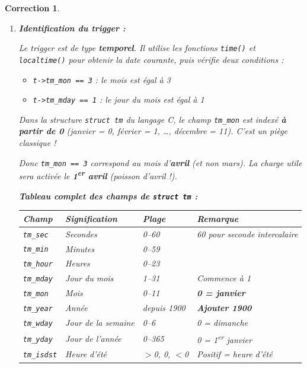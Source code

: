 \documentclass[a4paper,11pt]{article}
\theoremstyle{plain}
\newtheorem{correction}{Correction}
\theoremstyle{definition}
\begin{document}
\begin{correction}

\begin{enumerate}
\item \textbf{Identification du trigger :}

Le trigger est de type \textbf{temporel}. Il utilise les fonctions \texttt{time()} et \texttt{localtime()} pour obtenir la date courante, puis vérifie deux conditions :
\begin{itemize}
\item \texttt{t->tm\_mon == 3} : le mois est égal à 3
\item \texttt{t->tm\_mday == 1} : le jour du mois est égal à 1
\end{itemize}

\begin{attention}
Dans la structure \texttt{struct tm} du langage C, le champ \texttt{tm\_mon} est indexé \textbf{à partir de 0} (janvier = 0, février = 1, \ldots, décembre = 11). C'est un piège classique !

Donc \texttt{tm\_mon == 3} correspond au mois d'\textbf{avril} (et non mars). La charge utile sera activée le \textbf{1\textsuperscript{er} avril} (poisson d'avril !).
\end{attention}

\textbf{Tableau complet des champs de \texttt{struct tm} :}

\medskip
\begin{center}
\begin{tabular}{llll}
\toprule
\textbf{Champ} & \textbf{Signification} & \textbf{Plage} & \textbf{Remarque} \\
\midrule
\texttt{tm\_sec}   & Secondes         & 0--60  & 60 pour seconde intercalaire \\
\texttt{tm\_min}   & Minutes          & 0--59  & \\
\texttt{tm\_hour}  & Heures           & 0--23  & \\
\texttt{tm\_mday}  & Jour du mois     & 1--31  & Commence à 1 \\
\texttt{tm\_mon}   & Mois             & 0--11  & \textbf{0 = janvier} \\
\texttt{tm\_year}  & Année            & depuis 1900 & \textbf{Ajouter 1900} \\
\texttt{tm\_wday}  & Jour de la semaine & 0--6 & 0 = dimanche \\
\texttt{tm\_yday}  & Jour de l'année  & 0--365 & 0 = 1\textsuperscript{er} janvier \\
\texttt{tm\_isdst} & Heure d'été      & $>$0, 0, $<$0 & Positif = heure d'été \\
\bottomrule
\end{tabular}
\end{center}


\end{enumerate}
\end{correction}
\end{document}
